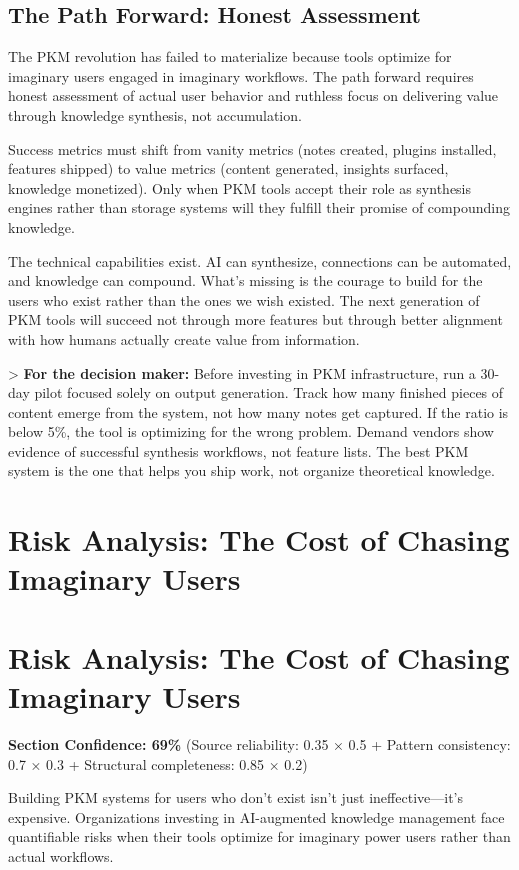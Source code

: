 \documentclass[a4paper,11pt]{article}
\begin{document}
\subsection{The Path Forward: Honest Assessment}

The PKM revolution has failed to materialize because tools optimize for imaginary users engaged in imaginary workflows. The path forward requires honest assessment of actual user behavior and ruthless focus on delivering value through knowledge synthesis, not accumulation.


Success metrics must shift from vanity metrics (notes created, plugins installed, features shipped) to value metrics (content generated, insights surfaced, knowledge monetized). Only when PKM tools accept their role as synthesis engines rather than storage systems will they fulfill their promise of compounding knowledge.


The technical capabilities exist. AI can synthesize, connections can be automated, and knowledge can compound. What's missing is the courage to build for the users who exist rather than the ones we wish existed. The next generation of PKM tools will succeed not through more features but through better alignment with how humans actually create value from information.


> \textbf{For the decision maker:} Before investing in PKM infrastructure, run a 30-day pilot focused solely on output generation. Track how many finished pieces of content emerge from the system, not how many notes get captured. If the ratio is below 5\%, the tool is optimizing for the wrong problem. Demand vendors show evidence of successful synthesis workflows, not feature lists. The best PKM system is the one that helps you ship work, not organize theoretical knowledge.

\clearpage
\section{Risk Analysis: The Cost of Chasing Imaginary Users}

\section{Risk Analysis: The Cost of Chasing Imaginary Users}

\textbf{Section Confidence: 69\%} (Source reliability: 0.35 × 0.5 + Pattern consistency: 0.7 × 0.3 + Structural completeness: 0.85 × 0.2)


Building PKM systems for users who don't exist isn't just ineffective—it's expensive. Organizations investing in AI-augmented knowledge management face quantifiable risks when their tools optimize for imaginary power users rather than actual workflows.
\end{document}
